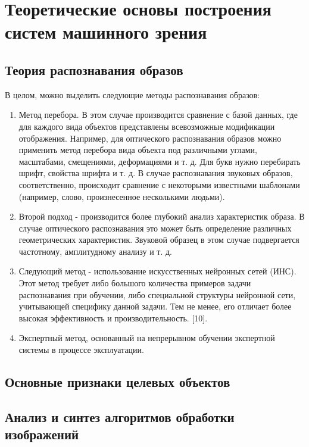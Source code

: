 \chapter{Теоретические основы построения систем машинного зрения} \label{chapt3}

\section{Теория распознавания образов} \label{sect3_1}

В целом, можно выделить следующие методы распознавания образов:

\begin{enumerate}
	\item Метод перебора. В этом случае производится сравнение с базой данных, где для каждого вида объектов представлены всевозможные модификации отображения. Например, для оптического распознавания образов можно применить метод перебора вида объекта под различными углами, масштабами, смещениями, деформациями и т. д. Для букв нужно перебирать шрифт, свойства шрифта и т. д. В случае распознавания звуковых образов, соответственно, происходит сравнение с некоторыми известными шаблонами (например, слово, произнесенное несколькими людьми).
	\item Второй подход - производится более глубокий анализ характеристик образа. В случае оптического распознавания это может быть определение различных геометрических характеристик. Звуковой образец в этом случае подвергается частотному, амплитудному анализу и т. д.
	\item Следующий метод - использование искусственных нейронных сетей (ИНС). Этот метод требует либо большого количества примеров задачи распознавания при обучении, либо специальной структуры нейронной сети, учитывающей специфику данной задачи. Тем не менее, его отличает более высокая эффективность и производительность. [10].
	\item Экспертный метод, основанный на непрерывном обучении экспертной системы в процессе эксплуатации.
\end{enumerate}

\section{Основные признаки целевых объектов} \label{sect3_2}

\section{Анализ и синтез алгоритмов обработки изображений} \label{sect3_3}

